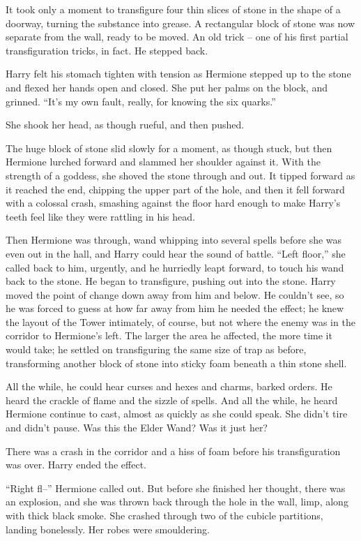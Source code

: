 It took only a moment to transfigure four thin slices of stone in the
shape of a doorway, turning the substance into grease. A rectangular
block of stone was now separate from the wall, ready to be moved. An old
trick -- one of his first partial transfiguration tricks, in fact. He
stepped back.

Harry felt his stomach tighten with tension as Hermione stepped up to
the stone and flexed her hands open and closed. She put her palms on the
block, and grinned. ``It's my own fault, really, for knowing the six
quarks.''

She shook her head, as though rueful, and then pushed.

The huge block of stone slid slowly for a moment, as though stuck, but
then Hermione lurched forward and slammed her shoulder against it. With
the strength of a goddess, she shoved the stone through and out. It
tipped forward as it reached the end, chipping the upper part of the
hole, and then it fell forward with a colossal crash, smashing against
the floor hard enough to make Harry's teeth feel like they were rattling
in his head.

Then Hermione was through, wand whipping into several spells before she
was even out in the hall, and Harry could hear the sound of battle.
``Left floor,'' she called back to him, urgently, and he hurriedly leapt
forward, to touch his wand back to the stone. He began to transfigure,
pushing out into the stone. Harry moved the point of change down away
from him and below. He couldn't see, so he was forced to guess at how
far away from him he needed the effect; he knew the layout of the Tower
intimately, of course, but not where the enemy was in the corridor to
Hermione's left. The larger the area he affected, the more time it would
take; he settled on transfiguring the same size of trap as before,
transforming another block of stone into sticky foam beneath a thin
stone shell.

All the while, he could hear curses and hexes and charms, barked orders.
He heard the crackle of flame and the sizzle of spells. And all the
while, he heard Hermione continue to cast, almost as quickly as she
could speak. She didn't tire and didn't pause. Was this the Elder Wand?
Was it just her?

There was a crash in the corridor and a hiss of foam before his
transfiguration was over. Harry ended the effect.

``Right fl--'' Hermione called out. But before she finished her thought,
there was an explosion, and she was thrown back through the hole in the
wall, limp, along with thick black smoke. She crashed through two of the
cubicle partitions, landing bonelessly. Her robes were smouldering.

